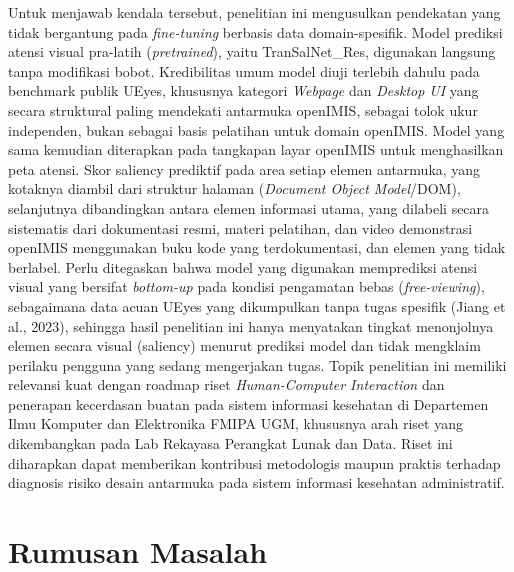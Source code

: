 Untuk menjawab kendala tersebut, penelitian ini mengusulkan pendekatan yang tidak bergantung pada \textit{fine-tuning} berbasis data domain-spesifik. Model prediksi atensi visual pra-latih (\textit{pretrained}), yaitu TranSalNet\_Res, digunakan langsung tanpa modifikasi bobot. Kredibilitas umum model diuji terlebih dahulu pada benchmark publik UEyes, khususnya kategori \textit{Webpage} dan \textit{Desktop UI} yang secara struktural paling mendekati antarmuka openIMIS, sebagai tolok ukur independen, bukan sebagai basis pelatihan untuk domain openIMIS. Model yang sama kemudian diterapkan pada tangkapan layar openIMIS untuk menghasilkan peta atensi. Skor saliency prediktif pada area setiap elemen antarmuka, yang kotaknya diambil dari struktur halaman (\textit{Document Object Model}/DOM), selanjutnya dibandingkan antara elemen informasi utama, yang dilabeli secara sistematis dari dokumentasi resmi, materi pelatihan, dan video demonstrasi openIMIS menggunakan buku kode yang terdokumentasi, dan elemen yang tidak berlabel. Perlu ditegaskan bahwa model yang digunakan memprediksi atensi visual yang bersifat \textit{bottom-up} pada kondisi pengamatan bebas (\textit{free-viewing}), sebagaimana data acuan UEyes yang dikumpulkan tanpa tugas spesifik (Jiang et al., 2023), sehingga hasil penelitian ini hanya menyatakan tingkat menonjolnya elemen secara visual (saliency) menurut prediksi model dan tidak mengklaim perilaku pengguna yang sedang mengerjakan tugas. Topik penelitian ini memiliki relevansi kuat dengan roadmap riset \textit{Human-Computer Interaction} dan penerapan kecerdasan buatan pada sistem informasi kesehatan di Departemen Ilmu Komputer dan Elektronika FMIPA UGM, khususnya arah riset yang dikembangkan pada Lab Rekayasa Perangkat Lunak dan Data. Riset ini diharapkan dapat memberikan kontribusi metodologis maupun praktis terhadap diagnosis risiko desain antarmuka pada sistem informasi kesehatan administratif.


\section{Rumusan Masalah}


